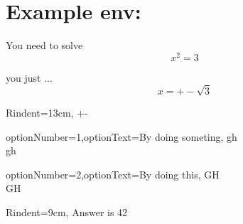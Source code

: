 \documentclass[12pt]{article}
\begin{document}
\tableofcontents
\newpage




\section{Example env:}



\begin{Example}{}

    You need to solve $$ x^2 = 3 $$


    \begin{ExampleTask}{}

        you just ...\\
        $$ x = +-\sqrt{3} $$

    \end{ExampleTask}


    \begin{ExampleAnswer}{Rindent=13cm,}
        +-

    \end{ExampleAnswer}
\end{Example}



\begin{Example}{}


    \begin{ExampleTask}{optionNumber=1,optionText=By doing someting,}
        gh\\
        gh
    \end{ExampleTask}


    \begin{ExampleTask}{optionNumber=2,optionText=By doing this,}
        GH\\
        GH
    \end{ExampleTask}


    \begin{ExampleAnswer}{Rindent=9cm,}
        Answer is 42
    \end{ExampleAnswer}
\end{Example}
\end{document}
